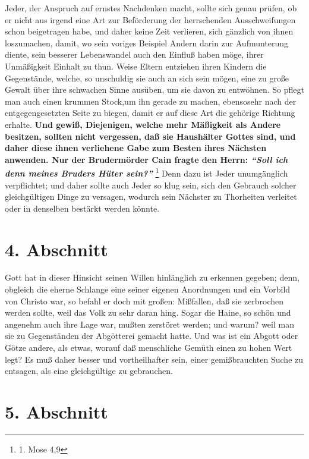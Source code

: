 Jeder, der Anspruch auf ernstes Nachdenken macht, sollte sich genau prüfen, ob
er nicht aus irgend eine Art zur Beförderung der herrschenden Ausschweifungen
schon beigetragen habe, und daher keine Zeit verlieren, sich gänzlich von ihnen
loszumachen, damit, wo sein voriges Beispiel Andern darin zur Aufmunterung
diente, sein besserer Lebenswandel auch den Einfluß haben möge, ihrer
Unmäßigkeit Einhalt zu thun. Weise Eltern
entziehen ihren Kindern die
Gegenstände, welche, so unschuldig sie auch an sich sein mögen, eine zu große
Gewalt über ihre schwachen Sinne ausüben, um sie davon zu entwöhnen. So pflegt
man auch einen krummen Stock,um ihn gerade zu machen, ebensosehr nach der
entgegengesetzten Seite zu biegen, damit er auf diese Art die gehörige Richtung
erhalte.  \label{ref:18_03_vorbild}\textbf{Und gewiß, Diejenigen, welche mehr
Mäßigkeit als Andere besitzen,
sollten nicht vergessen, daß sie Haushälter Gottes sind, und daher diese ihnen
verliehene Gabe zum Besten ihres Nächsten anwenden. Nur der Brudermörder
Cain
fragte den Herrn:
\textit{"`Soll ich denn meines Bruders Hüter sein?"'}}
\footnote{1. Mose 4,9}
Denn dazu ist Jeder unumgänglich verpflichtet; und daher sollte auch Jeder
so klug sein, sich den Gebrauch solcher gleichgültigen Dinge zu versagen,
wodurch sein Nächster zu Thorheiten verleitet oder in denselben bestärkt werden
könnte.

\section{4. Abschnitt} \label{kap18_ab4}

Gott hat in dieser Hinsicht seinen Willen hinlänglich zu erkennen gegeben; denn,
obgleich die eherne Schlange eine seiner eigenen Anordnungen und
ein Vorbild von
Christo war, so befahl er doch mit großen: Mißfallen, daß sie zerbrochen werden
sollte, weil das Volk zu sehr daran hing. Sogar die Haine, so schön und angenehm
auch ihre Lage war, mußten zerstöret werden; und warum? weil man sie zu
Gegenständen der Abgötterei gemacht hatte. Und was ist ein
Abgott oder Götze
andere, als etwas, worauf daß menschliche Gemüth einen zu hohen Wert legt? Es
muß daher besser und vortheilhafter sein, einer gemißbrauchten Suche zu
entsagen, als eine gleichgültige zu gebrauchen.

\section{5. Abschnitt} \label{kap18_ab5}

